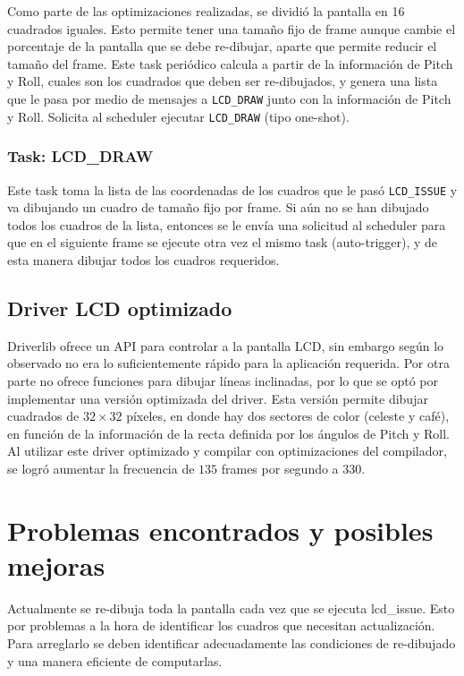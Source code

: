 Como parte de las optimizaciones realizadas, se dividió la pantalla en 16
cuadrados iguales. Esto permite tener una tamaño fijo de frame aunque cambie el
porcentaje de la pantalla que se debe re-dibujar, aparte que permite reducir el
tamaño del frame. Este task periódico calcula a partir de la información de
Pitch y Roll, cuales son los cuadrados que deben ser re-dibujados, y genera una
lista que le pasa por medio de mensajes a \texttt{LCD\_DRAW} junto con la
información de Pitch y Roll. Solicita al scheduler ejecutar \texttt{LCD\_DRAW}
(tipo one-shot).

\subsubsection{Task: LCD\_DRAW}
\label{sec:lcd_draw}
Este task toma la lista de las coordenadas de los cuadros que le pasó
\texttt{LCD\_ISSUE} y va dibujando un cuadro de tamaño fijo por frame. Si aún no
se han dibujado todos los cuadros de la lista, entonces se le envía una
solicitud al scheduler para que en el siguiente frame se ejecute otra vez el
mismo task (auto-trigger), y de esta manera dibujar todos los cuadros
requeridos.

\subsection{Driver LCD optimizado}
Driverlib ofrece un API para controlar a la pantalla LCD, sin embargo según lo
observado no era lo suficientemente rápido para la aplicación requerida. Por
otra parte no ofrece funciones para dibujar líneas inclinadas, por lo que se
optó por implementar una versión optimizada del driver. Esta versión permite
dibujar cuadrados de $32\times 32$ píxeles, en donde hay dos sectores de color
(celeste y café), en función de la información de la recta definida por los
ángulos de Pitch y Roll. Al utilizar este driver optimizado y compilar con
optimizaciones del compilador, se logró aumentar la frecuencia de $135$ frames
por segundo a $330$.

\section{Problemas encontrados y posibles mejoras}

Actualmente se re-dibuja toda la pantalla cada vez que se ejecuta lcd\_issue.
Esto por problemas a la hora de identificar los cuadros que necesitan
actualización. Para arreglarlo se deben identificar adecuadamente las
condiciones de re-dibujado y una manera eficiente de computarlas.

